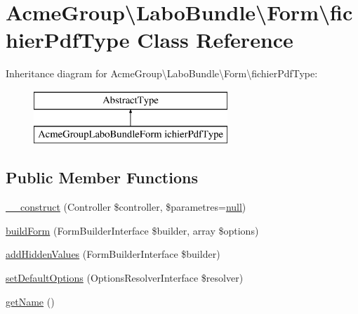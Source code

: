 \hypertarget{class_acme_group_1_1_labo_bundle_1_1_form_1_1fichier_pdf_type}{\section{Acme\+Group\textbackslash{}Labo\+Bundle\textbackslash{}Form\textbackslash{}fichier\+Pdf\+Type Class Reference}
\label{class_acme_group_1_1_labo_bundle_1_1_form_1_1fichier_pdf_type}
}
Inheritance diagram for Acme\+Group\textbackslash{}Labo\+Bundle\textbackslash{}Form\textbackslash{}fichier\+Pdf\+Type\+:\begin{figure}[H]
\begin{center}
\leavevmode
\includegraphics[height=2.000000cm]{class_acme_group_1_1_labo_bundle_1_1_form_1_1fichier_pdf_type}
\end{center}
\end{figure}
\subsection*{Public Member Functions}
\begin{DoxyCompactItemize}
\item 
\hyperlink{class_acme_group_1_1_labo_bundle_1_1_form_1_1fichier_pdf_type_a860a36c1ab3e25d113efab51fdce8106}{\+\_\+\+\_\+construct} (Controller \$controller, \$parametres=\hyperlink{validate_8js_afb8e110345c45e74478894341ab6b28e}{null})
\item 
\hyperlink{class_acme_group_1_1_labo_bundle_1_1_form_1_1fichier_pdf_type_a60ea49accfc2cbcebd395a267d237ed0}{build\+Form} (Form\+Builder\+Interface \$builder, array \$options)
\item 
\hyperlink{class_acme_group_1_1_labo_bundle_1_1_form_1_1fichier_pdf_type_a5e625a393204494590b9afce8640f1fc}{add\+Hidden\+Values} (Form\+Builder\+Interface \$builder)
\item 
\hyperlink{class_acme_group_1_1_labo_bundle_1_1_form_1_1fichier_pdf_type_a635f27c6a6af04f5b27e8ae2638d2751}{set\+Default\+Options} (Options\+Resolver\+Interface \$resolver)
\item 
\hyperlink{class_acme_group_1_1_labo_bundle_1_1_form_1_1fichier_pdf_type_af5dc96a034cf3759f37e532dff81f20d}{get\+Name} ()
\end{DoxyCompactItemize}


